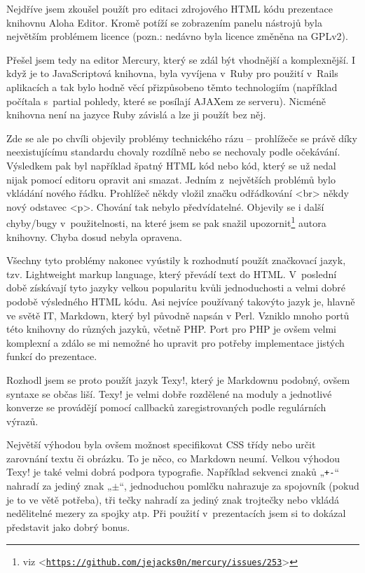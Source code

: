 \documentclass[11pt,twoside,a4paper]{book}
\let\oldUrl\url									%
\renewcommand\url[1]{<\texttt{\oldUrl{#1}}>}
\begin{document}
Nejdříve jsem zkoušel použít pro editaci zdrojového HTML kódu prezentace knihovnu Aloha Editor. Kromě potíží se
zobrazením panelu nástrojů byla největším problémem licence (pozn.: nedávno byla licence změněna na GPLv2).

Přešel jsem tedy na editor Mercury, který se zdál být vhodnější a komplexnější. I když je to JavaScriptová knihovna,
byla vyvíjena v~Ruby pro použití v~Rails aplikacích a tak bylo hodně věcí přizpůsobeno těmto technologiím (například
počítala s~partial pohledy, které se posílají AJAXem ze serveru). Nicméně knihovna není na jazyce Ruby závislá a lze ji
použít bez něj.

Zde se ale po chvíli objevily problémy technického rázu – prohlížeče se právě díky neexistujícímu
standardu chovaly rozdílně nebo se nechovaly podle očekávání. Výsledkem pak byl například špatný HTML kód nebo kód,
který se už nedal nijak pomocí editoru opravit ani smazat. Jedním z~největších problémů bylo vkládání nového řádku.
Prohlížeč někdy vložil značku odřádkování {\textless}br{\textgreater} někdy nový odstavec {\textless}p{\textgreater}.
Chování tak nebylo předvídatelné. Objevily se i další chyby/bugy v~použitelnosti, na které jsem se pak snažil
upozornit\footnote{viz \url{https://github.com/jejacks0n/mercury/issues/253}} autora knihovny. Chyba dosud nebyla opravena.

Všechny tyto problémy nakonec vyústily k rozhodnutí použít značkovací jazyk, tzv. Lightweight markup language, který
převádí text do HTML. V~poslední době získávají tyto jazyky velkou popularitu kvůli jednoduchosti a velmi dobré podobě
výsledného HTML kódu. Asi nejvíce používaný takovýto jazyk je, hlavně ve světě IT, Markdown, který byl původně napsán v
Perl. Vzniklo mnoho portů této knihovny do různých jazyků, včetně PHP. Port pro PHP je ovšem velmi komplexní a zdálo se
mi nemožné ho upravit pro potřeby implementace jistých funkcí do prezentace.

Rozhodl jsem se proto použít jazyk Texy!, který je Markdownu podobný, ovšem syntaxe se občas liší. Texy! je velmi dobře
rozdělené na moduly a jednotlivé konverze se provádějí pomocí callbacků zaregistrovaných podle regulárních výrazů.

Největší výhodou byla ovšem možnost specifikovat CSS třídy nebo určit zarovnání textu či obrázku. To je něco, co Markdown neumí. Velkou výhodou Texy! je také velmi dobrá podpora typografie. Například sekvenci znaků „\lstinline|+-|“ nahradí za jediný znak „$\pm$“, jednoduchou pomlčku nahrazuje za spojovník (pokud je to ve větě potřeba), tři tečky nahradí za jediný znak trojtečky nebo vkládá nedělitelné mezery za spojky atp. Při použití v~prezentacích jsem si to dokázal představit jako dobrý bonus.
\end{document}
